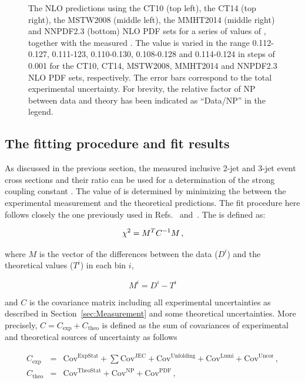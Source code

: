 \begin{figure}[!htbp]
\begin{center}
    \caption{The NLO predictions using the CT10 (top left), the CT14 (top right),
      the MSTW2008 (middle left), the MMHT2014 (middle right) and NNPDF2.3 (bottom) NLO PDF sets for a 
      series of values of \alpsmz, together with the measured \ratio. 
      The \alpsmz value is varied in the range 0.112-0.127, 0.111-123, 0.110-0.130, 0.108-0.128 and 0.114-0.124 in steps of 0.001 for the CT10, CT14, MSTW2008, MMHT2014 and NNPDF2.3 NLO PDF sets, respectively. The error bars correspond to the total experimental uncertainty. For brevity, the relative factor of NP 
      between data and theory has been indicated as ``Data/NP'' in
      the legend.}
    \label{fig:R32_sensitivity}
  \end{center}
\end{figure}

\subsection{The fitting procedure and fit results}
\label{sec:Fits}
As discussed in the previous section, the measured inclusive 2-jet and
3-jet event cross sections and their ratio \ratio can be used for a
determination of the strong coupling constant \alpsmz. The value of
\alpsmz is determined by minimizing the \chisq between the
experimental measurement and the theoretical predictions. The fit
procedure here follows closely the one previously used in
Refs.~\cite{Chatrchyan:2013txa} and~\cite{Khachatryan:2014waa}. The
\chisq is defined as:

\begin{equation}
  \label{chisq}
  \chi^2 = M^{T}C^{-1}M\,,
\end{equation}

where $M$ is the vector of the differences between the data ($D^{i}$)
and the theoretical values ($T^{i}$) in each bin $i$,

\begin{equation}
  \label{eqn:M_matrix}
  M^{i}=D^{i}-T^{i}
\end{equation}

and $C$ is the covariance matrix including all experimental
uncertainties as described in Section~\ref{sec:Measurement} and some
theoretical uncertainties. More precisely,
$C=C_\mathrm{exp}+C_\mathrm{theo}$ is defined as the sum of
covariances of experimental and theoretical sources of uncertainty as
follows

\begin{eqnarray}
  \label{eqn:c_exp}
  C_\mathrm{exp} &=& \mathrm{Cov}^\mathrm{ExpStat} + \sum\mathrm{Cov}^\mathrm{JEC} +
  \mathrm{Cov}^\mathrm{Unfolding} +
  \mathrm{Cov}^\mathrm{Lumi} +
  \mathrm{Cov}^\mathrm{Uncor}\,,\\
  C_\mathrm{theo} &=& \mathrm{Cov}^\mathrm{TheoStat} + \mathrm{Cov}^\mathrm{NP} + \mathrm{Cov}^\mathrm{PDF}\,,
  \label{eqn:c_theo}
\end{eqnarray}

